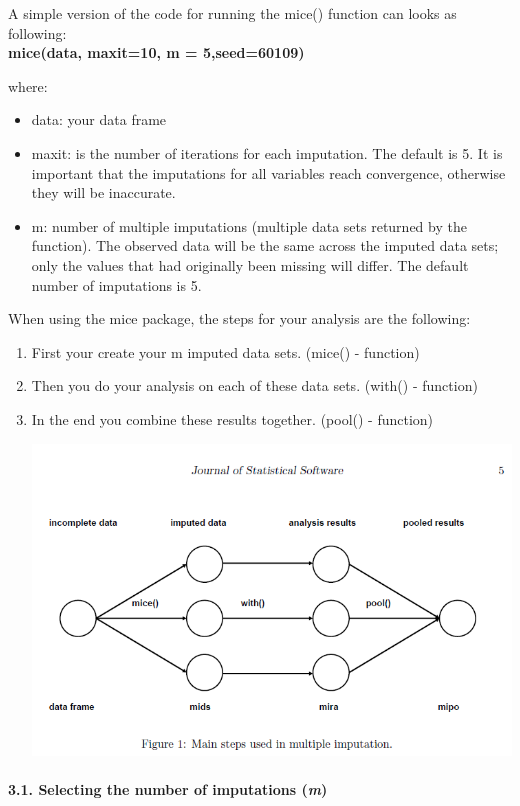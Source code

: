 \documentclass[
]{article}
\begin{document}
A simple version of the code for running the mice() function can looks
as following:\\
\textbf{mice(data, maxit=10, m = 5,seed=60109)}

where:

\begin{itemize}
\item
  data: your data frame
\item
  maxit: is the number of iterations for each imputation. The default is
  5. It is important that the imputations for all variables reach
  convergence, otherwise they will be inaccurate.
\item
  m: number of multiple imputations (multiple data sets returned by the
  function). The observed data will be the same across the imputed data
  sets; only the values that had originally been missing will differ.
  The default number of imputations is 5.
\end{itemize}

When using the mice package, the steps for your analysis are the
following:

\begin{enumerate}
\def\labelenumi{\arabic{enumi}.}
\item
  First your create your m imputed data sets. (mice() - function)
\item
  Then you do your analysis on each of these data sets. (with() -
  function)
\item
  In the end you combine these results together. (pool() - function)

  \includegraphics{images/Steps_MI.png}
\end{enumerate}

\hypertarget{selecting-the-number-of-imputations-m}{%
\paragraph{\texorpdfstring{3.1. Selecting the number of imputations
(\emph{m})}{3.1. Selecting the number of imputations (m)}}\label{selecting-the-number-of-imputations-m}}
\end{document}
